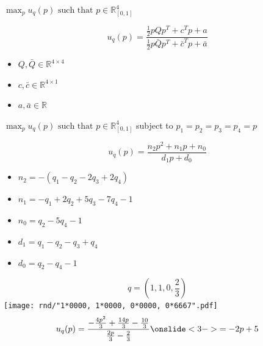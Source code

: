 \documentclass{beamer}
\begin{document}
\begin{frame}
\centering
\huge
\( \max_p u_q(p)\text{ such that }p\in\mathbb{R}_{[0,1]}^{4}\)
\end{frame}

\begin{frame}
    \begin{center}
    \begin{lemma}
     \[ u_q(p) = \frac{\frac{1}{2} p Q  p^T + c^T  p + a} 
    {\frac{1}{2} p \bar{Q} p^T + \bar{c}^T p + \bar{a}}\]

    \begin{itemize}
      \item \(Q, \bar{Q} \in\mathbb{R}^{4 \times 4}\)
      \item \(c, \bar{c}\in\mathbb{R}^{4 \times 1}\) 
      \item \(a, \bar{a}\in\mathbb{R}\)  
   \end{itemize}
    \end{lemma}
    \end{center}
\end{frame}

\begin{frame}
\centering
\huge
\( \max_p u_q(p)\text{ such that }p\in\mathbb{R}_{[0,1]}^{4}\)
\pause
\vfill
\Large
subject to \( p_1 = p_2 = p_3 = p_4 =p\)
\end{frame}

\begin{frame}
\begin{lemma}
\[ u_q(p)  =  \frac{n_2p^2 + n_1p + n_0 } {d_1p + d_0} \]

\begin{itemize}
    \item \( n_{2} = - (q_{1} - q_{2} - 2 q_{3} + 2 q_{4})\)
    \item \( n_{1} = - q_{1} + 2 q_{2} + 5 q_{3} - 7 q_{4} - 1 \)
    \item \( n_{0} =   q_{2} - 5q_{4} - 1\)
    \item \( d_{1} =   q_{1} - q_{2} - q_{3} + q_{4}\)
    \item \( d_{0} =   q_{2} - q_{4} -1\)
\end{itemize}
\end{lemma}
\end{frame}

\begin{frame}
  \centering
  \Large \[ q = \left(1, 1, 0, \frac{2}{3}\right) \]
  \texttt{[image: rnd/"1*0000, 1*0000, 0*0000, 0*6667".pdf]}
  \pause
  \small
      \begin{equation*} u_q(p) = \frac{-\frac{4p^2}{3} + \frac{14p}{3} - \frac{10}{3}}
                   {\frac{2p}{3} - \frac{2}{3}} \onslide<3->{= -2p + 5}
    \end{equation*} 
\end{frame}
\end{document}
